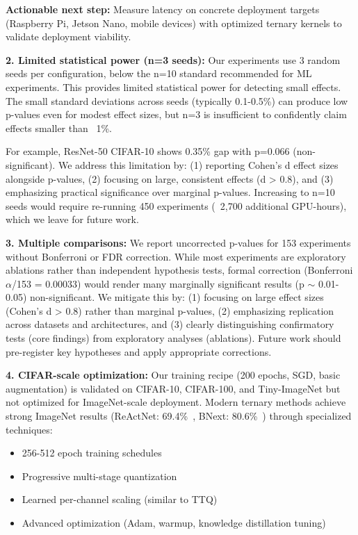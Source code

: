 \textbf{Actionable next step:} Measure latency on concrete deployment targets (Raspberry Pi, Jetson Nano, mobile devices) with optimized ternary kernels to validate deployment viability.

\textbf{2. Limited statistical power (n=3 seeds):} Our experiments use 3 random seeds per configuration, below the n=10 standard recommended for ML experiments. This provides limited statistical power for detecting small effects. The small standard deviations across seeds (typically 0.1-0.5\%) can produce low p-values even for modest effect sizes, but n=3 is insufficient to confidently claim effects smaller than ~1\%.

For example, ResNet-50 CIFAR-10 shows 0.35\% gap with p=0.066 (non-significant). We address this limitation by: (1) reporting Cohen's d effect sizes alongside p-values, (2) focusing on large, consistent effects (d > 0.8), and (3) emphasizing practical significance over marginal p-values. Increasing to n=10 seeds would require re-running 450 experiments (~2,700 additional GPU-hours), which we leave for future work.

\textbf{3. Multiple comparisons:} We report uncorrected p-values for 153 experiments without Bonferroni or FDR correction. While most experiments are exploratory ablations rather than independent hypothesis tests, formal correction (Bonferroni $\alpha$/153 = 0.00033) would render many marginally significant results (p $\sim$ 0.01-0.05) non-significant. We mitigate this by: (1) focusing on large effect sizes (Cohen's d > 0.8) rather than marginal p-values, (2) emphasizing replication across datasets and architectures, and (3) clearly distinguishing confirmatory tests (core findings) from exploratory analyses (ablations). Future work should pre-register key hypotheses and apply appropriate corrections.

\textbf{4. CIFAR-scale optimization:} Our training recipe (200 epochs, SGD, basic augmentation) is validated on CIFAR-10, CIFAR-100, and Tiny-ImageNet but not optimized for ImageNet-scale deployment. Modern ternary methods achieve strong ImageNet results (ReActNet: 69.4\%~\cite{liu2020reactnet}, BNext: 80.6\%~\cite{guo2022bnext}) through specialized techniques:
\begin{itemize}
    \item 256-512 epoch training schedules
    \item Progressive multi-stage quantization
    \item Learned per-channel scaling (similar to TTQ)
    \item Advanced optimization (Adam, warmup, knowledge distillation tuning)
\end{itemize}


